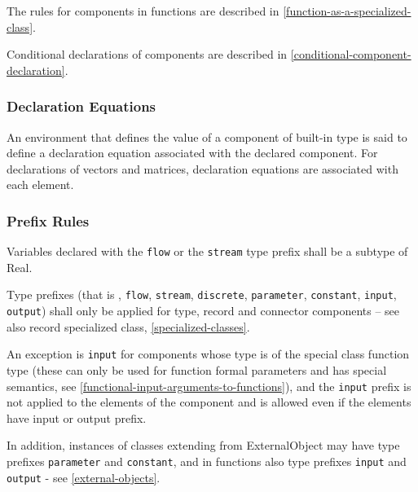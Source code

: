 The rules for components in functions are described in \autoref{function-as-a-specialized-class}.

Conditional declarations of components are described in \autoref{conditional-component-declaration}.

\subsubsection{Declaration Equations}

An environment that defines the value of a component of built-in type is
said to define a declaration equation associated with the declared
component. For declarations of vectors and matrices, declaration
equations are associated with each element.

\subsubsection{Prefix Rules}

Variables declared with the \lstinline!flow! or the \lstinline!stream! type prefix shall be a
subtype of Real.

Type prefixes (that is , \lstinline!flow!, \lstinline!stream!, \lstinline!discrete!, 
\lstinline!parameter!, \lstinline!constant!,
\lstinline!input!, \lstinline!output!) shall only be applied for type, record and connector
components -- see also record specialized class, \autoref{specialized-classes}.

An exception is \lstinline!input! for components whose type is of the special class
function type (these can only be used for function formal parameters and
has special semantics, see \autoref{functional-input-arguments-to-functions}), and the \lstinline!input! prefix is not
applied to the elements of the component and is allowed even if the
elements have input or output prefix.

In addition, instances of classes extending from ExternalObject may have
type prefixes \lstinline!parameter! and \lstinline!constant!, and in functions also type
prefixes \lstinline!input! and \lstinline!output! - see \autoref{external-objects}.

